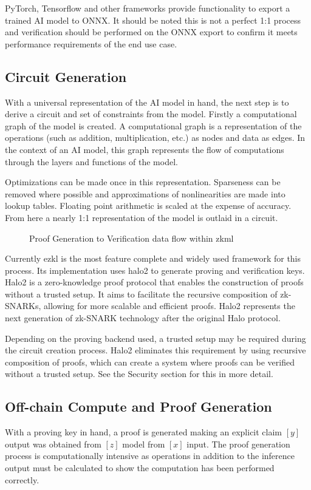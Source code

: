 \documentclass[conference]{IEEEtran}
\begin{document}
PyTorch, Tensorflow and other frameworks provide functionality to export a trained AI model to ONNX. It should be noted this is not a perfect 1:1 process and verification should be performed on the ONNX export to confirm it meets performance requirements of the end use case.
\subsection{Circuit Generation}
With a universal representation of the AI model in hand, the next step is to derive a circuit and set of constraints from the model. Firstly a computational graph of the model is created.  A computational graph is a representation of the operations (such as addition, multiplication, etc.) as nodes and data as edges. In the context of an AI model, this graph represents the flow of computations through the layers and functions of the model. 

Optimizations can be made once in this representation. Sparseness can be removed where possible and approximations of nonlinearities are made into lookup tables. Floating point arithmetic is scaled at the expense of accuracy.  From here a nearly 1:1 representation of the model is outlaid in a circuit.
\begin{figure}[!ht]
    \centering
    
    \caption{Proof Generation to Verification data flow within zkml}
    \label{fig:Fig 3}
\end{figure}

Currently ezkl is the most feature complete and widely used framework for this process. Its implementation uses halo2 to generate proving and verification keys. Halo2 is a zero-knowledge proof protocol that enables the construction of proofs without a trusted setup.  It aims to facilitate the recursive composition of zk-SNARKs, allowing for more scalable and efficient proofs. Halo2 represents the next generation of zk-SNARK technology after the original Halo protocol. 

Depending on the proving backend used, a trusted setup may be required during the circuit creation process. Halo2 eliminates this requirement by using recursive composition of proofs, which can create a system where proofs can be verified without a trusted setup. See the Security section for this in more detail.
\subsection{Off-chain Compute and Proof Generation}
With a proving key in hand, a proof is generated making an explicit claim $[y]$ output was obtained from $[z]$ model from $[x]$ input. The proof generation process is computationally intensive as operations in addition to the inference output must be calculated to show the computation has been performed correctly.
\end{document}
